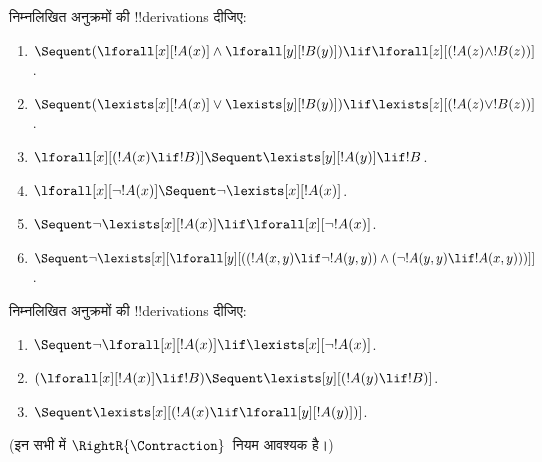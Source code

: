 \documentclass[../../../include/open-logic-section]{subfiles}
\begin{document}
\begin{prob}
निम्नलिखित अनुक्रमों की !!{derivation}s दीजिए:
\begin{enumerate}
\item $\Sequent (\lforall[x][!A(x)] \land \lforall[y][!B(y)]) \lif
\lforall[z][(!A(z) \land !B(z))]$.
\item $\Sequent (\lexists[x][!A(x)] \lor \lexists[y][!B(y)]) \lif
\lexists[z][(!A(z) \lor !B(z))]$.
\item $\lforall[x][(!A(x) \lif !B)] \Sequent \lexists[y][!A(y)] \lif !B$.
\item $\lforall[x][\lnot !A(x)] \Sequent \lnot\lexists[x][!A(x)]$.
\item $\Sequent \lnot\lexists[x][!A(x)] \lif \lforall[x][\lnot !A(x)]$.
\item $\Sequent \lnot\lexists[x][\lforall[y][((!A(x,y) \lif \lnot
!A(y,y)) \land (\lnot !A(y,y) \lif !A(x,y)))]]$.
\end{enumerate}
\end{prob}

\begin{prob}
निम्नलिखित अनुक्रमों की !!{derivation}s दीजिए:
\begin{enumerate}
\item $\Sequent \lnot\lforall[x][!A(x)] \lif \lexists[x][\lnot!A(x)]$.
\item $(\lforall[x][!A(x)] \lif !B) \Sequent \lexists[y][(!A(y) \lif !B)]$.
\item $\Sequent \lexists[x][(!A(x) \lif \lforall[y][!A(y)])]$.
\end{enumerate}
(इन सभी में $\RightR{\Contraction}$~नियम आवश्यक है।)
\end{prob}
\end{document}

